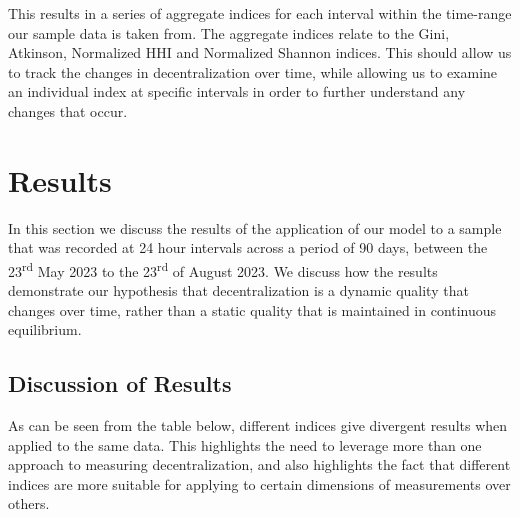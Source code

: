 \documentclass[conference]{IEEEtran}
\begin{document}
This results in a series of aggregate indices for each interval within the time-range our sample data is taken from.  The aggregate indices relate to the Gini, Atkinson, Normalized HHI and Normalized Shannon indices.  This should allow us to track the changes in decentralization over time, while allowing us to examine an individual index at specific intervals in order to further understand any changes that occur.


\section{Results}

In this section we discuss the results of the application of our model to a sample that was recorded at 24 hour intervals across a period of 90 days, between the 23\textsuperscript{rd} May 2023 to the 23\textsuperscript{rd} of August 2023.  We discuss how the results demonstrate our hypothesis that decentralization is a dynamic quality that changes over time, rather than a static quality that is maintained in continuous equilibrium.

\subsection{Discussion of Results}

As can be seen from the table below, different indices give divergent results when applied to the same data.  This highlights the need to leverage more than one approach to measuring decentralization, and also highlights the fact that different indices are more suitable for applying to certain dimensions of measurements over others.
\end{document}
